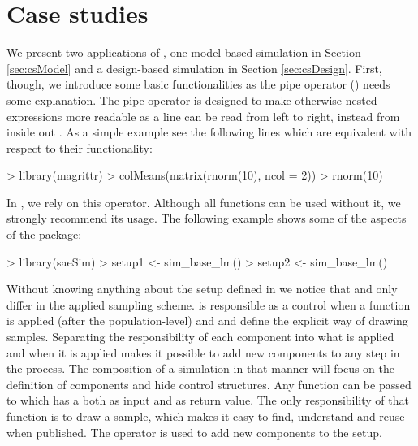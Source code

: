 \documentclass[article]{ajs}
\begin{document}
\section{Case studies}
\label{sec:caseStudy}
We present two applications of , one model-based simulation in Section \ref{sec:csModel} and a design-based simulation in Section \ref{sec:csDesign}. First, though, we introduce some basic functionalities as the pipe operator (\proglang{\%>\%}) needs some explanation. The pipe operator is designed to make otherwise nested expressions more readable as a line can be read from left to right, instead from inside out \citep{bache14}. As a simple example see the following lines which are equivalent with respect to their functionality:

\begin{Schunk}
\begin{Sinput}
> library(magrittr)
> colMeans(matrix(rnorm(10), ncol = 2))
> rnorm(10) %
\end{Sinput}
\end{Schunk}

In , we rely on this operator. Although all functions can be used without it, we strongly recommend its usage. The following example shows some of the aspects of the package:


\begin{Schunk}
\begin{Sinput}
> library(saeSim)
> setup1 <- sim_base_lm() %
> setup2 <- sim_base_lm() %
\end{Sinput}
\end{Schunk}

Without knowing anything about the setup defined in  we notice that  and  only differ in the applied sampling scheme.  is responsible as a control when a function is applied (after the population-level) and  and  define the explicit way of drawing samples. Separating the responsibility of each component into what is applied and when it is applied makes it possible to add new components to any step in the process. The composition of a simulation in that manner will focus on the definition of components and hide control structures. Any function can be passed to  which has a  both as input and as return value. The only responsibility of that function is to draw a sample, which makes it easy to find, understand and reuse when published. The operator \proglang{\%>\%} is used to add new components to the setup. 
\end{document}
